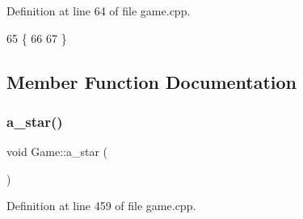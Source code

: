 Definition at line 64 of file game.\+cpp.


\begin{DoxyCode}
65 \{
66 
67 \}
\end{DoxyCode}


\subsection{Member Function Documentation}
\mbox{\label{class_game_aa3d45b075393d6751f77db3ce31ab9ba}} 
\subsubsection{\texorpdfstring{a\+\_\+star()}{a\_star()}}
{\footnotesize\ttfamily void Game\+::a\+\_\+star (\begin{DoxyParamCaption}{ }\end{DoxyParamCaption})}



Definition at line 459 of file game.\+cpp.


